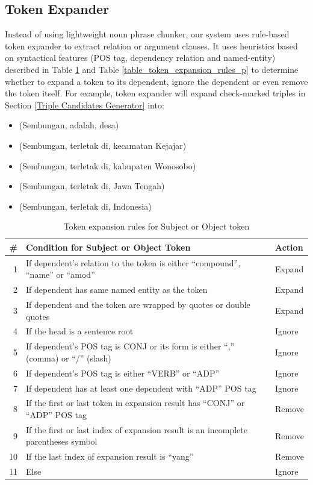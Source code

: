 \documentclass[conference,compsoc]{IEEEtran}
\begin{document}
\subsection{Token Expander}

Instead of using lightweight noun phrase chunker\cite{banko2007open}, our system uses rule-based token expander to extract relation or argument clauses. It uses heuristics based on syntactical features (POS tag, dependency relation and named-entity) described in Table \ref{table_token_expansion_rules_s_o} and Table \ref{table_token_expansion_rules_p} to determine whether to expand a token to its dependent, ignore the dependent or even remove the token itself. For example, token expander will expand check-marked triples in Section \ref{Triple Candidates Generator} into:

\begin{itemize}
\item (Sembungan, adalah, desa)
\item (Sembungan, terletak di, kecamatan Kejajar)
\item (Sembungan, terletak di, kabupaten Wonosobo)
\item (Sembungan, terletak di, Jawa Tengah)
\item (Sembungan, terletak di, Indonesia)
\end{itemize}

\begin{table}[!t]
\renewcommand{\arraystretch}{1.5}
\caption{Token expansion rules for Subject or Object token}
\label{table_token_expansion_rules_s_o}
\centering
\begin{tabular}{r|p{6cm}|l}
\hline
\textbf{\#} & \textbf{Condition for Subject or Object Token} & \textbf{Action} \\
\hline
1 & If dependent's relation to the token  is either “compound”, “name”  or “amod” & Expand \\
2 & If dependent has same named entity as the token & Expand \\
3 & If dependent and the token are wrapped by quotes or double quotes  & Expand \\
4 & If the head is a sentence root & Ignore \\
5 & If dependent's POS tag is CONJ or its form is either “,” (comma) or “/” (slash) & Ignore \\
6 & If dependent's POS tag is either “VERB” or “ADP” & Ignore \\
7 & If dependent has at least one dependent with “ADP” POS tag & Ignore \\
8 & If the first or last token in expansion result has “CONJ” or “ADP” POS tag & Remove \\
9 & If the first or last index of expansion result is an incomplete parentheses symbol & Remove \\
10 & If the last index of expansion result is “yang” & Remove \\
11 & Else & Ignore \\

\end{tabular}
\end{table}
\end{document}
